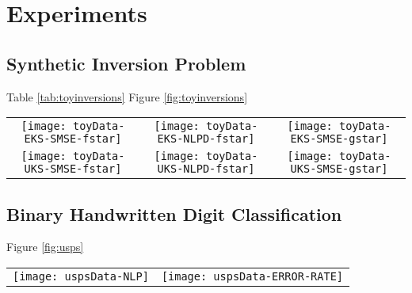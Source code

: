 \section{Experiments}
%
\subsection{Synthetic Inversion Problem}
%
Table \ref{tab:toyinversions}
Figure \ref{fig:toyinversions}
%
\begin{table*}[h]
\caption{Performance of the \eks and \uks methods compared to their GP counterparts (\egp and \ugp) on a range of synthetic benchmarks. 
\gp is the corresponds to the GP analytical solution in the linear case.
\label{tab:toyinversions}
}

\begin{center}

\end{center}
\end{table*}
%
\begin{figure*}
\centering
\begin{tabular}{c c c}
\texttt{[image: toyData-EKS-SMSE-fstar]} &
\texttt{[image: toyData-EKS-NLPD-fstar]} &
\texttt{[image: toyData-EKS-SMSE-gstar]} \\
\texttt{[image: toyData-UKS-SMSE-fstar]} &
\texttt{[image: toyData-UKS-NLPD-fstar]} &
\texttt{[image: toyData-UKS-SMSE-gstar]} \\
\end{tabular}
\caption{The performance of the \eks (top) and \uks (bottom) as a function of the number of features used. 
\label{fig:toyinversions}
}
\end{figure*}
%
\subsection{Binary Handwritten Digit Classification}
Figure \ref{fig:usps}

\begin{figure*}[h]
\centering
\begin{tabular}{c c}
\texttt{[image: uspsData-NLP]}  &
\texttt{[image: uspsData-ERROR-RATE]}  
\end{tabular}
\caption{The performance of the \eks and \uks (bottom) on the binary classification problem for the \usps dataset as a function of 
the number of  basis used. \egp and \ugp are the original (full) \gp models.
\label{fig:usps}
}
\end{figure*}
%
